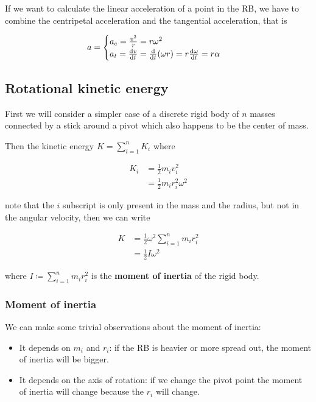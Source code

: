 \documentclass[14pt]{extarticle}
\begin{document}
If we want to calculate the linear acceleration of a point in the RB, we have to combine the centripetal acceleration and the tangential acceleration, that is

$$
    a = \begin{cases}
        a_c = \frac{v^2}{r} = r\omega^2 \\
        a_t = \dv{v}{t} = \dv{t}(\omega r) = r \dv{\omega}{t} = r\alpha
    \end{cases}
$$

\subsection{Rotational kinetic energy}

First we will consider a simpler case of a discrete rigid body of $n$ masses connected by a stick around a pivot which also happens to be the center of mass.

Then the kinetic energy $K = \sum_{i=1}^n K_i$ where

\begin{align}
    K_i & = \frac{1}{2}m_i v_i^2          \\
        & = \frac{1}{2}m_i r_i^2 \omega^2
\end{align}

note that the $i$ subscript is only present in the mass and the radius, but not in the angular velocity, then we can write

\begin{align}
    K & = \frac{1}{2} \omega^2 \sum_{i=1}^n m_i r_i^2 \\
      & = \frac{1}{2} I \omega^2
\end{align}

where $I \coloneq \sum_{i=1}^n m_i r_i^2$ is the \textbf{moment of inertia} of the rigid body.

\subsubsection{Moment of inertia}

We can make some trivial observations about the moment of inertia:

\begin{itemize}
    \item It depends on $m_i$ and $r_i$: if the RB is heavier or more spread out, the moment of inertia will be bigger.
    \item It depends on the axis of rotation: if we change the pivot point the moment of inertia will change because the $r_i$ will change.
\end{itemize}
\end{document}
